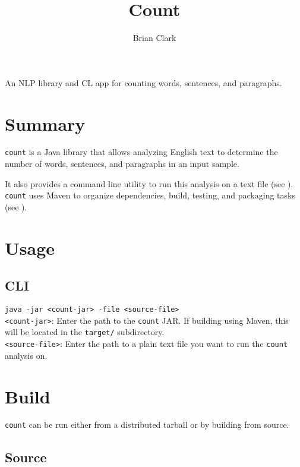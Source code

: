 \documentclass{article}
\begin{document}
\title{Count}
\author{Brian Clark}

\maketitle


An NLP library and CL app for counting words, sentences, and paragraphs.

\tableofcontents
\newpage


\section{Summary}
\texttt{count} is a Java library that allows analyzing English text to determine the number of words, sentences, and paragraphs in an input sample.

It also provides a command line utility to run this analysis on a text file (see ). \texttt{count} uses Maven to organize dependencies, build, testing, and packaging tasks (see ).

\section{Usage}
\label{sec:usage}

\subsection{CLI}

\texttt{java -jar <count-jar> -file <source-file>} \\

\texttt{<count-jar>}: Enter the path to the \texttt{count} JAR. If building using Maven, this will be located in the \texttt{target/} subdirectory. \\

\texttt{<source-file>}: Enter the path to a plain text file you want to run the \texttt{count} analysis on.


\section{Build}
\label{sec:build}
\texttt{count} can be run either from a distributed tarball or by building from source.

\subsection{Source}
\end{document}
